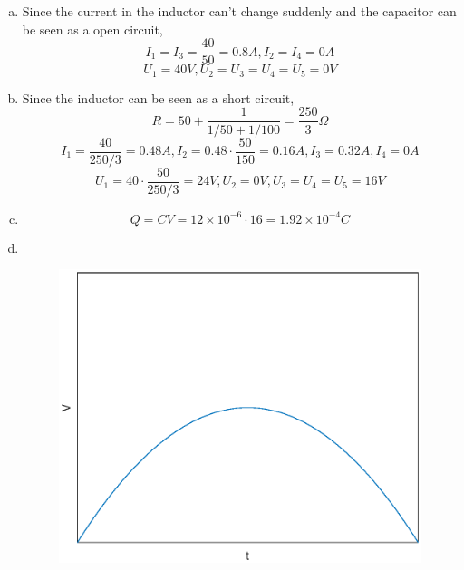 \documentclass{article}
\begin{document}
\section{}
\begin{enumerate}[(a)]
\item
Since the current in the inductor can't change suddenly and the capacitor can be seen as a open circuit,
$$I_1=I_3=\frac{40}{50}=0.8A, I_2=I_4=0A$$
$$U_1=40V,U_2=U_3=U_4=U_5=0V$$
\item
Since the inductor can be seen as a short circuit, 
$$R=50+\frac{1}{1/50+1/100}=\frac{250}{3}\Omega$$
$$I_1=\frac{40}{250/3}=0.48A,I_2=0.48\cdot\frac{50}{150}=0.16A,I_3=0.32A,I_4=0A$$
$$U_1=40\cdot\frac{50}{250/3}=24V,U_2=0V,U_3=U_4=U_5=16V$$
\item
$$Q=CV=12\times10^{-6}\cdot16=1.92\times10^{-4}C$$
\item \ 
\begin{figure}[h]
	\centering
	\includegraphics[scale=0.4]{1.eps}
\end{figure}
\end{enumerate}
\end{document}

